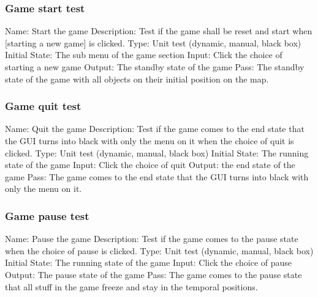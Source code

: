 \documentclass{article}
\begin{document}
\subsubsection{Game start test}
Name:  Start the game\newline
Description: Test if the game shall be reset and start when [starting a new 
game] is clicked. \newline
Type: Unit test (dynamic, manual, black box) \newline
Initial State:  The sub menu of the game section \newline
Input: Click the choice of starting a new game \newline
Output: The standby state of the game\newline
Pass: The standby state of the game with all objects on their initial position 
on the map. \newline

\subsubsection{Game quit test}
Name:  Quit the game\newline
Description: Test if the game comes to the end state that the GUI turns into 
black with only the menu on it when the choice of quit is clicked. \newline
Type: Unit test (dynamic, manual, black box) \newline
Initial State:  The running state of the game \newline
Input: Click the choice of quit\newline
Output: the end state of the game  \newline
Pass: The game comes to the end state that the GUI turns into black with only 
the menu on it. \newline

\subsubsection{Game pause test}
Name:  Pause the game\newline
Description: Test if the game comes to the pause state when the choice of 
pause is clicked. \newline
Type: Unit test (dynamic, manual, black box) \newline
Initial State: The running state of the game \newline
Input: Click the choice of pause \newline
Output: The pause state of the game\newline
Pass: The game comes to the pause state that all stuff in the game freeze and 
stay in the temporal positions. \newline
\end{document}
